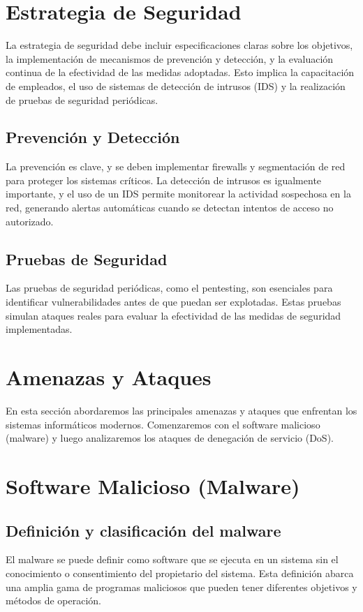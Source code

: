 \section{Estrategia de Seguridad}
La estrategia de seguridad debe incluir especificaciones claras sobre los objetivos, la implementación de mecanismos de prevención y detección, y la evaluación continua de la efectividad de las medidas adoptadas. Esto implica la capacitación de empleados, el uso de sistemas de detección de intrusos (IDS) y la realización de pruebas de seguridad periódicas.

\subsection{Prevención y Detección}
La prevención es clave, y se deben implementar firewalls y segmentación de red para proteger los sistemas críticos. La detección de intrusos es igualmente importante, y el uso de un IDS permite monitorear la actividad sospechosa en la red, generando alertas automáticas cuando se detectan intentos de acceso no autorizado.

\subsection{Pruebas de Seguridad}
Las pruebas de seguridad periódicas, como el pentesting, son esenciales para identificar vulnerabilidades antes de que puedan ser explotadas. Estas pruebas simulan ataques reales para evaluar la efectividad de las medidas de seguridad implementadas.


\section{Amenazas y Ataques}

En esta sección abordaremos las principales amenazas y ataques que enfrentan los sistemas informáticos modernos. Comenzaremos con el software malicioso (malware) y luego analizaremos los ataques de denegación de servicio (DoS).
\section{Software Malicioso (Malware)}

\subsection{Definición y clasificación del malware}

El malware se puede definir como software que se ejecuta en un sistema sin el conocimiento o consentimiento del propietario del sistema. Esta definición abarca una amplia gama de programas maliciosos que pueden tener diferentes objetivos y métodos de operación.

